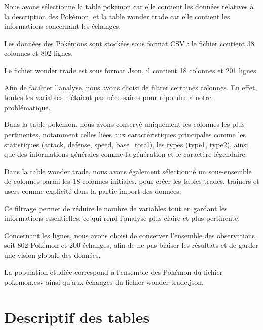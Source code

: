 \documentclass[mstat,12pt]{unswthesis}
\begin{document}
\bigskip

Nous avons sélectionné la table pokemon car elle contient les données
relatives à la description des Pokémon, et la table wonder trade car
elle contient les informations concernant les échanges.

Les données des Pokémons sont stockées sous format CSV : le fichier
contient 38 colonnes et 802 lignes.

Le fichier wonder trade est sous format Json, il contient 18 colonnes et
201 lignes.

\bigskip

Afin de faciliter l'analyse, nous avons choisi de filtrer certaines
colonnes. En effet, toutes les variables n'étaient pas nécessaires pour
répondre à notre problématique.

Dans la table pokemon, nous avons conservé uniquement les colonnes les
plus pertinentes, notamment celles liées aux caractéristiques
principales comme les statistiques (attack, defense, speed,
base\_total), les types (type1, type2), ainsi que des informations
générales comme la génération et le caractère légendaire.

Dans la table wonder trade, nous avons également sélectionné un
sous-ensemble de colonnes parmi les 18 colonnes initiales, pour créer
les tables trades, trainers et users comme explicité dans la partie
import des données.

\bigskip

Ce filtrage permet de réduire le nombre de variables tout en gardant les
informations essentielles, ce qui rend l'analyse plus claire et plus
pertinente.

Concernant les lignes, nous avons choisi de conserver l'ensemble des
observations, soit 802 Pokémon et 200 échanges, afin de ne pas biaiser
les résultats et de garder une vision globale des données.

\bigskip

La population étudiée correspond à l'ensemble des Pokémon du fichier
pokemon.csv ainsi qu'aux échanges du fichier wonder trade.json.

\bigskip 
\bigskip 
\medskip 
\vspace{2.5cm}

\section{Descriptif des tables}\label{descriptif-des-tables}

\bigskip
\end{document}
